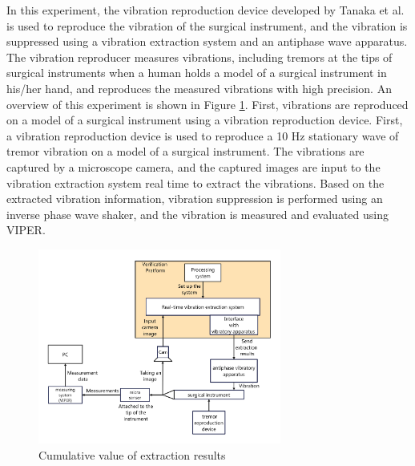 In this experiment, the vibration reproduction device developed by Tanaka et al.\cite{bib:tremor_reproduction_eng}
is used to reproduce the vibration of the surgical instrument,
and the vibration is suppressed using a vibration extraction system and
an antiphase wave apparatus. The vibration reproducer measures vibrations,
including tremors at the tips of surgical instruments when a human holds a model of a surgical instrument in his/her hand,
and reproduces the measured vibrations with high precision. An overview of this experiment is shown in Figure \ref{figure:suppression_test}.
First, vibrations are reproduced on a model of a surgical instrument using a vibration reproduction device.
First, a vibration reproduction device is used to reproduce a 10 Hz stationary wave of tremor vibration
on a model of a surgical instrument.
The vibrations are captured by a microscope camera, and the captured images are input to the vibration extraction system
real time to extract the vibrations. Based on the extracted vibration information,
vibration suppression is performed using an inverse phase wave shaker,
and the vibration is measured and evaluated using VIPER.



\begin{figure}[tb]
  \centering
  \includegraphics[width = 8cm,pagebox=cropbox,clip]{img/suppression_test.pdf}
  \caption{Cumulative value of extraction results}
  \label{figure:suppression_test}
\end{figure}
